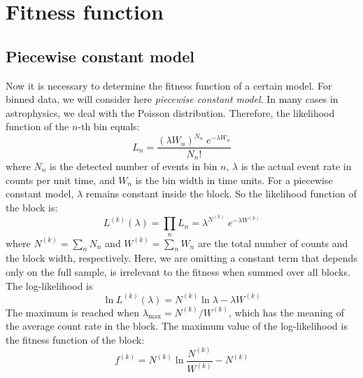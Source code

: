 \documentclass{article}
\begin{document}
\section{Fitness function}
\subsection{Piecewise constant model}
Now it is necessary to determine the fitness function of a certain model. For binned data, we will consider here \textit{piecewise constant model}. In many cases in astrophysics, we deal with the Poisson distribution. Therefore, the likelihood function of the $n$-th bin equals:
 \begin{equation}
     L_n=\frac{(\lambda W_n)^{N_n}\;e^{-\lambda W_n}}{N_n!}
 \end{equation}
where $N_n$ is the detected number of events in bin $n$, $\lambda$ is the actual event rate in counts per unit time, and $W_n$ is the bin width in time units. For a piecewise constant model, $\lambda$ remains constant inside the block. So the likelihood function of the block is:
\begin{equation}
    L^{(k)}(\lambda)=\prod_n L_n=\lambda^{N^{(k)}}\;e^{-\lambda W^{(k)}}
\end{equation}
where $N^{(k)}=\sum_n N_n$ and $W^{(k)}=\sum_n W_n$ are the total number of counts and the block width, respectively. Here, we are omitting a constant term that depends only on the full sample, is irrelevant to the fitness when summed over all blocks. The log-likelihood is 
\begin{equation}
    \ln L^{(k)}(\lambda)=N^{(k)}\ln\lambda-\lambda W^{(k)}
\end{equation}
The maximum is reached when $\lambda_{\text{max}}=N^{(k)}/W^{(k)}$, which has the meaning of the average count rate in the block. The maximum value of the log-likelihood is the fitness function of the block:
\begin{equation}
f^{(k)}=N^{(k)}\ln\frac{N^{(k)}}{W^{(k)}}-N^{(k)}
\end{equation}
\end{document}
